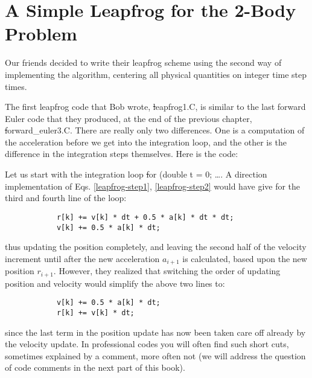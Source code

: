 \section{A Simple Leapfrog for the 2-Body Problem}

Our friends decided to write their leapfrog scheme using the second
way of implementing the algorithm, centering all physical quantities
on integer time step times.

The first leapfrog code that Bob wrote, {\st leapfrog1.C}, is similar
to the last forward Euler code that they produced, at the end of the
previous chapter, {\st forward\_euler3.C}.  There are really only two
differences.  One is a computation of the acceleration before we get
into the integration loop, and the other is the difference in the
integration steps themselves.  Here is the code:


Let us start with the integration loop {\st for (double t = 0; \dots}.
A direction implementation of Eqs. \ref{leapfrog-step1}, \ref{leapfrog-step2}
would have give for the third and fourth line of the loop:

\begin{small}
\begin{verbatim}
            r[k] += v[k] * dt + 0.5 * a[k] * dt * dt;
            v[k] += 0.5 * a[k] * dt;
\end{verbatim}
\end{small}

\noindent
thus updating the position completely, and leaving the second half of
the velocity increment until after the new acceleration $a_{i+1}$ is
calculated, based upon the new position $r_{i+1}$.  However, they
realized that switching the order of updating position and velocity
would simplify the above two lines to:

\begin{small}
\begin{verbatim}
            v[k] += 0.5 * a[k] * dt;
            r[k] += v[k] * dt;
\end{verbatim}
\end{small}

\noindent
since the last term in the position update has now been taken care off
already by the velocity update.  In professional codes you will often
find such short cuts, sometimes explained by a comment, more often not
(we will address the question of code comments in the next part of
this book).

